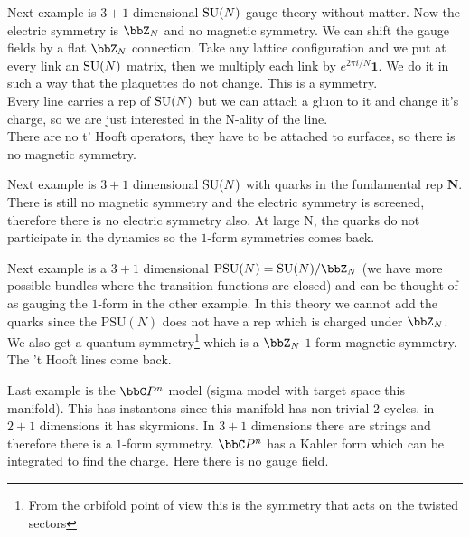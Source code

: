 Next example is $3+1$ dimensional $\mathrm{SU}(N)$ gauge theory without matter. Now the electric symmetry is $\bbZ_{N}$ and no magnetic symmetry. We can shift the gauge fields by a flat $\bbZ_{N}$ connection. Take any lattice configuration and we put at every link an $\mathrm{SU}(N)$ matrix, then we multiply each link by $e^{2\pi i/N}\mathbf{1}$. We do it in such a way that the plaquettes do not change. This is a symmetry.\\
Every line carries a rep of $\mathrm{SU}(N)$ but we can attach a gluon to it and change it's charge, so we are just interested in the N-ality of the line.\\
There are no t' Hooft operators, they have to be attached to surfaces, so there is no magnetic symmetry.

Next example is $3+1$ dimensional $\mathrm{SU}(N)$ with quarks in the fundamental rep $\mathbf{N}$. There is still no magnetic symmetry and the electric symmetry is screened, therefore there is no electric symmetry also. At large N, the quarks do not participate in the dynamics so the $1$-form symmetries comes back.

Next example is a $3+1$ dimensional $\text{PSU}(N)=\SU(N)/\bbZ_{N}$ (we have more possible bundles where the transition functions are closed) and can be thought of as gauging the $1$-form in the other example. In this theory we cannot add the quarks since the $\text{PSU}(N)$ does not have a rep which is charged under $\bbZ_{N}$. We also get a quantum symmetry\footnote{From the orbifold point of view this is the symmetry that acts on the twisted sectors} which is a $\bbZ_{N}$  $1$-form magnetic symmetry. The 't Hooft lines come back.

Last example is the $\bbC P^{n}$ model (sigma model with target space this manifold). This has instantons since this manifold has non-trivial $2$-cycles. in $2+1$ dimensions it has skyrmions. In $3+1$ dimensions there are strings and therefore there is a $1$-form symmetry. $\bbC P^{n}$ has a Kahler form which can be integrated to find the charge. Here there is no gauge field.